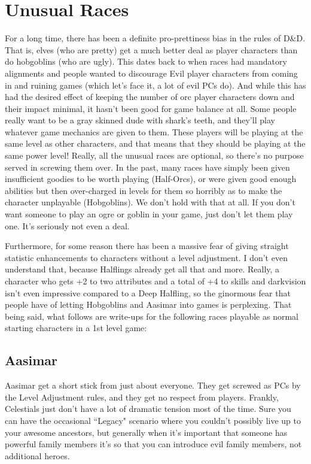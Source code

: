 
\section{Unusual Races}

For a long time, there has been a definite pro-prettiness bias in the rules of D\&D. That is, elves (who are pretty) get a much better deal as player characters than do hobgoblins (who are ugly). This dates back to when races had mandatory alignments and people wanted to discourage Evil player characters from coming in and ruining games (which let's face it, a lot of evil PCs do). And while this has had the desired effect of keeping the number of orc player characters down and their impact minimal, it hasn't been good for game balance at all. Some people really want to be a gray skinned dude with shark's teeth, and they'll play whatever game mechanics are given to them. These players will be playing at the same level as other characters, and that means that they should be playing at the same power level! Really, all the unusual races are optional, so there's no purpose served in screwing them over. In the past, many races have simply been given insufficient goodies to be worth playing (Half-Orcs), or were given good enough abilities but then over-charged in levels for them so horribly as to make the character unplayable (Hobgoblins). We don't hold with that at all. If you don't want someone to play an ogre or goblin in your game, just don't let them play one. It's seriously not even a deal.

Furthermore, for some reason there has been a massive fear of giving straight statistic enhancements to characters without a level adjustment. I don't even understand that, because Halflings already get all that and more. Really, a character who gets +2 to two attributes and a total of +4 to skills and darkvision isn't even impressive compared to a Deep Halfling, so the ginormous fear that people have of letting Hobgoblins and Aasimar into games is perplexing. That being said, what follows are write-ups for the following races playable as normal starting characters in a 1st level game:

\subsection{Aasimar}
\vspace*{-8pt}

Aasimar get a short stick from just about everyone. They get screwed as PCs by the Level Adjustment rules, and they get no respect from players. Frankly, Celestials just don't have a lot of dramatic tension most of the time. Sure you can have the occasional ``Legacy" scenario where you couldn't possibly live up to your awesome ancestors, but generally when it's important that someone has powerful family members it's so that you can introduce evil family members, not additional heroes.

